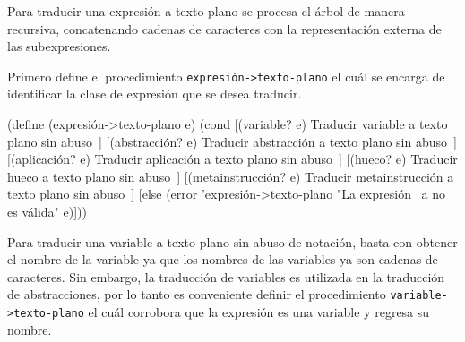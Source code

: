 Para traducir una expresión a texto plano se procesa el árbol de manera recursiva, concatenando cadenas de caracteres con la representación externa de las subexpresiones.

Primero define el procedimiento {\tt{}\protect{}\protect{}expresión->texto-plano} el cuál se encarga de identificar la clase de expresión que se desea traducir.

\nwenddocs{}\endmoddef
(define (expresión->texto-plano e)
  (cond
   [(variable? e)
    \LA{}Traducir variable a texto plano sin abuso~{\nwtagstyle{}}\RA{}]
   [(abstracción? e)
    \LA{}Traducir abstracción a texto plano sin abuso~{\nwtagstyle{}}\RA{}]
   [(aplicación? e)
    \LA{}Traducir aplicación a texto plano sin abuso~{\nwtagstyle{}}\RA{}]
   [(hueco? e)
    \LA{}Traducir hueco a texto plano sin abuso~{\nwtagstyle{}}\RA{}]
   [(metainstrucción? e)
    \LA{}Traducir metainstrucción a texto plano sin abuso~{\nwtagstyle{}}\RA{}]
   [else
    (error 'expresión->texto-plano
           "La expresión ~a no es válida" e)]))

\eatline
{}\nwendcode{}\nwdocspar

Para traducir una variable a texto plano sin abuso de notación, basta con obtener el nombre de la variable ya que los nombres de las variables ya son cadenas de caracteres. Sin embargo, la traducción de variables es utilizada en la traducción de abstracciones, por lo tanto es conveniente definir el procedimiento {\tt{}\protect{}variable\protect{}->texto-plano} el cuál corrobora que la expresión es una variable y regresa su nombre.

